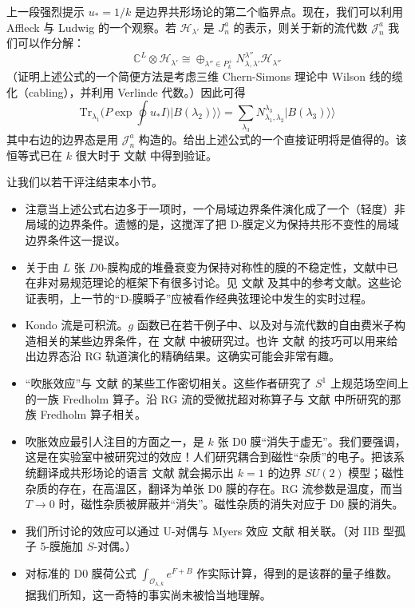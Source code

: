 \documentclass[11pt,a4paper]{ctexart}
\begin{document}
上一段强烈提示 \(u_*=1/k\) 是边界共形场论的第二个临界点。现在，我们可以利用 Affleck 与 Ludwig 的一个观察。若 \({\mathcal H}_{\lambda'}\) 是 \(J_n^a\) 的表示，则关于新的流代数 \({\mathcal J}_n^a\) 我们可以作分解： \[\mathbb{C}^L\otimes {\mathcal H}_{\lambda'} \cong \oplus_{\lambda''\in P^+_k} N_{\lambda, \lambda'}^{\lambda''} {\mathcal H}_{\lambda''}\] （证明上述公式的一个简便方法是考虑三维 Chern-Simons 理论中 Wilson 线的缆化（cabling），并利用 Verlinde 代数。）因此可得 \[{\mathrm{Tr}}_{\lambda_1}\biggl( P \exp \oint   u_*  I   \biggr) \vert B(\lambda_2)\rangle\rangle =
\sum_{\lambda_3} N_{\lambda_1,\lambda_2}^{\lambda_3} \vert B(\lambda_3) \rangle\rangle\] 其中右边的边界态是用 \({\mathcal J}_n^a\) 构造的。给出上述公式的一个直接证明将是值得的。该恒等式已在 \(k\) 很大时于 文献 中得到验证。

让我们以若干评注结束本小节。

\begin{itemize}
\item
  注意当上述公式右边多于一项时，一个局域边界条件演化成了一个（轻度）非局域的边界条件。遗憾的是，这搅浑了把 D-膜定义为保持共形不变性的局域边界条件这一提议。
\item
  关于由 \(L\) 张 \(D0\)-膜构成的堆叠衰变为保持对称性的膜的不稳定性，文献中已在非对易规范理论的框架下有很多讨论。见 文献 及其中的参考文献。这些论证表明，上一节的``D-膜瞬子''应被看作经典弦理论中发生的实时过程。
\item
  Kondo 流是可积流。\(g\) 函数已在若干例子中、以及对与流代数的自由费米子构造相关的某些边界条件，在 文献 中被研究过。也许 文献 的技巧可以用来给出边界态沿 RG 轨道演化的精确结果。这确实可能会非常有趣。
\item
  ``吹胀效应''与 文献 的某些工作密切相关。这些作者研究了 \(S^1\) 上规范场空间上的一族 Fredholm 算子。沿 RG 流的受微扰超对称算子与 文献 中所研究的那族 Fredholm 算子相关。
\item
  吹胀效应最引人注目的方面之一，是 \(k\) 张 D0 膜``消失于虚无''。我们要强调，这是在实验室中被研究过的效应！人们研究耦合到磁性``杂质''的电子。把该系统翻译成共形场论的语言 文献 就会揭示出 \(k=1\) 的边界 \(SU(2)\) 模型；磁性杂质的存在，在高温区，翻译为单张 D0 膜的存在。RG 流参数是温度，而当 \(T \to 0\) 时，磁性杂质被屏蔽并``消失''。磁性杂质的消失对应于 D0 膜的消失。
\item
  我们所讨论的效应可以通过 U-对偶与 Myers 效应 文献 相关联。（对 IIB 型孤子 5-膜施加 \(S\)-对偶。）
\item
  对标准的 D0 膜荷公式 \(\int_{{\mathcal O}_{\lambda,k}} e^{F+B}\) 作实际计算，得到的是该群的量子维数。据我们所知，这一奇特的事实尚未被恰当地理解。
\end{itemize}
\end{document}
